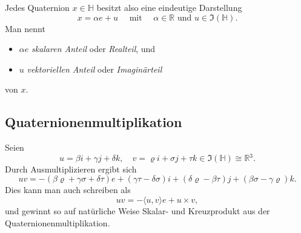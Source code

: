 \documentclass[aspectratio=169]{beamer}
\newcommand{\Ham}{\ensuremath{\mathbb{H}}{ }}
\newcommand{\R}{\ensuremath{\mathbb{R}}{ }}
\begin{document}
    \begin{frame}
        Jedes Quaternion \(x \in \Ham\) besitzt also eine eindeutige Darstellung
        \[
            x = \alpha e + u \quad \text { mit } \quad \alpha \in \R \text{ und } u \in \Im(\Ham)
        .\]
        Man nennt
        \begin{itemize}
            \item 
                \(\alpha e\) \emph{skalaren Anteil} oder \emph{Realteil}, und 

            \item
                \(u\) \emph{vektoriellen Anteil} oder \emph{Imaginärteil}
        \end{itemize}
        von \(x\).

    \end{frame}

    \subsection{Quaternionenmultiplikation}

    \begin{frame}
        Seien
        \[
            u = \beta i + \gamma j + \delta k, \quad v = \varrho i + \sigma j + \tau k \in \Im(\Ham) \cong \R^3
        .\]
        Durch Ausmultiplizieren ergibt sich
        \[
            uv = - (\beta \varrho + \gamma \sigma + \delta \tau) e + (\gamma \tau - \delta \sigma) i + (\delta \varrho - \beta \tau) j + (\beta \sigma - \gamma \varrho) k
        .\]
        Dies kann man auch schreiben als
        \[
            uv = - \langle u, v \rangle e + u \times v
        ,\] 
        und gewinnt so auf natürliche Weise Skalar- und Kreuzprodukt aus der Quaternionenmultiplikation.
    \end{frame}
\end{document}
